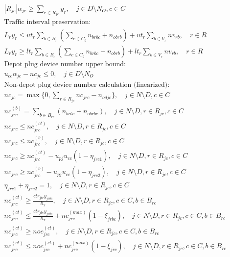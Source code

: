 \documentclass[11pt]{ctexart}
\begin{document}
\begin{align*}
& |R_{jc}| \alpha_{jc} \geq \sum_{r \in R_{jc}} y_r, \quad j \in D \setminus N_O, c \in C \tag{27} \\
&\text{Traffic interval preservation:} \\
& L_r y_r \leq ut_r \sum_{b \in B_r} \left( \sum_{c \in C_b} n_{brbc} + n_{obrb} \right) + ut_r \sum_{b \in V_r} nv_{rb}, \quad r \in R \tag{28} \\
& L_r y_r \geq lt_r \sum_{b \in B_r} \left( \sum_{c \in C_b} n_{brbc} + n_{obrb} \right) + lt_r \sum_{b \in V_r} nv_{rb}, \quad r \in R \tag{29} \\
&\text{Depot plug device number upper bound:} \\
& u_{cc} \alpha_{jc} - nc_{jc} \leq 0, \quad j \in D \setminus N_O \tag{30} \\
&\text{Non-depot plug device number calculation (linearized):} \\
& nc_{jc} = \max\{0,\sum_{r \in R_{jc}} nc_{jrc} - n_{odjc}\}, \quad j \in N \setminus D, c \in C \tag{31} \\
& nc^{(b)}_{jrc} = \sum_{b \in B_{rc}}(n_{brbc} + n_{obrbc}), \quad j \in N \setminus D, r \in R_{jc}, c \in C \tag{32} \\
& nc_{jrc} \leq nc^{(ct)}_{jrc}, \quad j \in N \setminus D, r \in R_{jc}, c \in C \tag{33} \\
& nc_{jrc} \leq nc^{(b)}_{jrc}, \quad j \in N \setminus D, r \in R_{jc}, c \in C \tag{34} \\
& nc_{jrc} \geq nc^{(ct)}_{jrc} - u_{pj} u_{cc} (1 - \eta_{jrc1}), \quad j \in N \setminus D, r \in R_{jc}, c \in C \tag{35} \\
& nc_{jrc} \geq nc^{(b)}_{jrc} - u_{pj} u_{cc} (1 - \eta_{jrc2}), \quad j \in N \setminus D, r \in R_{jc}, c \in C \tag{36} \\
& \eta_{jrc1} + \eta_{jrc2} = 1, \quad j \in N \setminus D, r \in R_{jc}, c \in C \tag{37} \\
& nc^{(ct)}_{jrc} \geq \frac{ctr_{jbc} y_{jrbc}}{lt_r}, \quad j \in N \setminus D, r \in R_{jc}, c \in C, b \in B_{rc} \tag{38} \\
& nc^{(ct)}_{jrc} \leq \frac{ctr_{jbc} y_{jrbc}}{lt_r} + nc^{(max)}_{jrc} (1 - \xi_{jrbc}), \quad j \in N \setminus D, r \in R_{jc}, c \in C, b \in B_{rc} \tag{39} \\
& nc^{(ct)}_{jrc} \geq noc^{(ct)}_{jrc}, \quad j \in N \setminus D, r \in R_{jc}, c \in C, b \in B_{rc} \tag{40} \\
& nc^{(ct)}_{jrc} \leq noc^{(ct)}_{jrc} + nc^{(max)}_{jrc} (1 - \xi_{jrc}), \quad j \in N \setminus D, r \in R_{jc}, c \in C, b \in B_{rc} \tag{41} \\

\end{align*}
\end{document}
